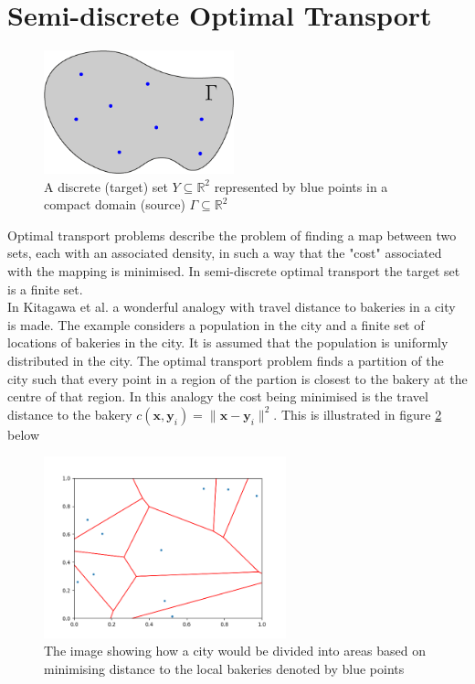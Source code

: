 \section{Semi-discrete Optimal Transport}
\begin{figure}[h]
	\centering
	\includegraphics[width=5.5cm]{project/probmeasure}
	\caption[Semi-discrete Optimal Transport]{A discrete (target) set $Y \subseteq \mathbb{R}^2$ represented by blue points in a compact domain (source) $\Gamma \subseteq \mathbb{R}^2 $}
	\label{fig:probmeasure}
\end{figure}
Optimal transport problems describe the problem of finding a map between two sets, each with an associated density, in such a way that the "cost" associated with the mapping is minimised. In semi-discrete optimal transport the target set is a finite set.\\
\linebreak
In Kitagawa et al. \cite{Kitagawa2016} a wonderful analogy with travel distance to bakeries in a city is made. The example considers a population in the city and a finite set of locations of bakeries in the city. It is assumed that the population is uniformly distributed in the city. The optimal transport problem finds a partition of the city such that every point in a region of the partion is closest to the bakery at the centre of that region. In this analogy the cost being minimised is the travel distance to the bakery $c(\bm{x},\bm{y}_i) = \|\bm{x}-\bm{y}_i \|^2$. This is illustrated in figure \ref{fig:laguerrediagram0w}  below
\begin{figure}[h]
	\centering
	\includegraphics[width=7cm]{project/laguerre_diagram_0w}
	\caption[The partitioning of a city]{The image showing how a city would be divided into areas based on minimising distance to the local bakeries denoted by blue points}
	\label{fig:laguerrediagram0w}
\end{figure}
